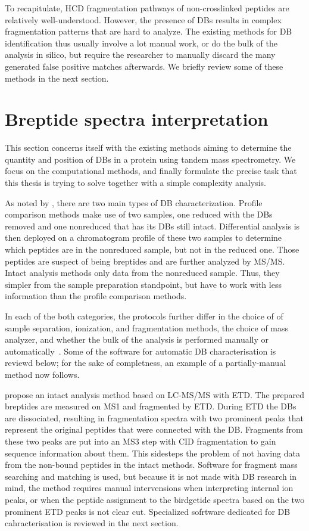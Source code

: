 To recapitulate, HCD fragmentation pathways of non-crosslinked peptides are relatively well-understood. However, the presence of DBs results in complex fragmentation patterns that are hard to analyze. The existing methods for DB identification thus usually involve a lot manual work, or do the bulk of the analysis in silico, but require the researcher to manually discard the many generated false positive matches afterwards. We briefly review some of these methods in the next section.

\section{Breptide spectra interpretation}\label{sec:analysis}

This section concerns itself with the existing methods aiming to determine the quantity and position of DBs in a protein using tandem mass spectrometry. We focus on the computational methods, and finally formulate the precise task that this thesis is trying to solve together with a simple complexity analysis.

As noted by \citet{lakbub2018recent}, there are two main types of DB characterization. Profile comparison methods make use of two samples, one reduced with the DBs removed and one nonreduced that has its DBs still intact. Differential analysis is then deployed on a chromatogram profile of these two samples to determine which peptides are in the nonreduced sample, but not in the reduced one. Those peptides are suspect of being breptides and are further analyzed by MS/MS. Intact analysis methods only data from the nonreduced sample. Thus, they simpler from the sample preparation standpoint, but have to work with less information than the profile comparison methods.

In each of the both categories, the protocols further differ in the choice of of sample separation, ionization, and fragmentation methods, the choice of mass analyzer, and whether the bulk of the analysis is performed manually or automatically~\cite{lakbub2018recent}. Some of the software for automatic DB characterisation is reviewd below; for the sake of completness, an example of a partially-manual method now follows.

\citet{wu2009mass} propose an intact analysis method based on LC-MS/MS with ETD\@. The prepared breptides are measured on MS1 and fragmented by ETD\@. During ETD the DBs are dissociated, resulting in fragmentation spectra with two prominent peaks that represent the original peptides that were connected with the DB\@. Fragments from these two peaks are put into an MS3 step with CID fragmentation to gain sequence information about them. This sidesteps the problem of not having data from the non-bound peptides in the intact methods. Software for fragment mass searching and matching is used, but because it is not made with DB research in mind, the method requires manual intervensions when interpreting internal ion peaks, or when the peptide assignment to the birdgetide spectra based on the two prominent ETD peaks is not clear cut. Specialized sofrtware dedicated for DB cahracterisation is reviewed in the next section.

